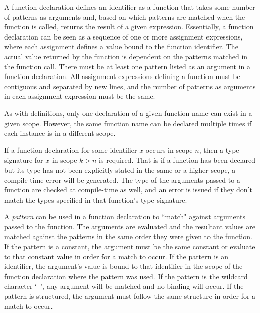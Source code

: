 A function declaration defines an identifier as a function that takes
some number of patterns as arguments and, based on which patterns are matched
when the function is called, returns the result
of a given expression. Essentially, a function declaration can be seen as a 
sequence of one or more assignment expressions, where each assignment defines
a value bound to the function identifier. The actual value returned by the function
is dependent on the patterns matched in the function call. There must be at least one pattern listed
as an argument in a function declaration. All assignment expressions defining
a function must be contiguous and separated by new lines, and the number of
patterns as arguments in each assignment expression must be the same.

As with definitions, only one declaration of a given function name can exist
in a given scope. However, the same function name can be declared multiple
times if each instance is in a different scope.

If a function declaration for some identifier $x$ occurs in scope $n$, then
a type signature for $x$ in scope $k>n$ is required. That is if a function has
been declared but its type has not been explicitly stated in the same or a higher
scope, a compile-time error will be generated. The type of the arguments
passed to a function are checked at compile-time as well, and an error
is issued if they don't match the types specified in that function's 
type signature.

A \emph{pattern} can be used in a function declaration to ``match" against arguments passed to the function. The
arguments are evaluated and the resultant values are matched against the patterns in the same order they were given
to the function. If the pattern
is a constant, the argument must be the same constant or evaluate to that constant value in order for a match to
occur. If the pattern is an identifier, the argument's value is bound to that identifier in the scope of the
function declaration where the pattern was used. If the pattern is the wildcard character `\texttt{_}', 
any argument will be matched and no binding will occur. If the pattern is structured, the argument must follow
the same structure in order for a match to occur. 

